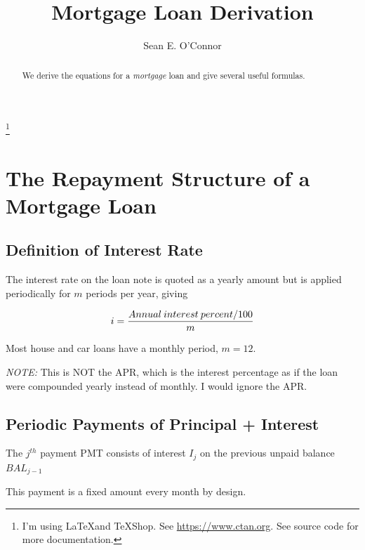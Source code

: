 \documentclass{article}
\author{ Sean E. O'Connor}
\title{Mortgage Loan Derivation}
\theoremstyle{definition} %
\theoremstyle{definition} %
\theoremstyle{remark} %
\begin{document}
\maketitle

\begin{abstract}
We derive the equations for a \emph{mortgage} loan and give several useful formulas.
\end{abstract} 

\footnote{I'm using \LaTeX and \TeX Shop.  See \url{https://www.ctan.org}. See source code for more documentation.} 

\tableofcontents

\bigskip %


\pagebreak 

\section{The Repayment Structure of a Mortgage Loan}

\subsection{Definition of Interest Rate}

The interest rate on the loan note is quoted as a yearly amount but is applied periodically for $m$ periods per year, giving

\begin{equation}
i =  {{Annual  \: interest    \:  percent / 100} \over m}
\end{equation}

Most house and car loans have a monthly period, $m = 12$.    %

\emph{NOTE:}  This is NOT the APR, which is the interest percentage as if the loan were compounded yearly instead of monthly.  I would ignore the APR.

\subsection{Periodic Payments of Principal + Interest}

The $j^{th}$ payment PMT consists of interest $I_j$ on the previous unpaid balance $BAL_{j-1}$

This payment is a fixed amount every month by design.
\end{document}
